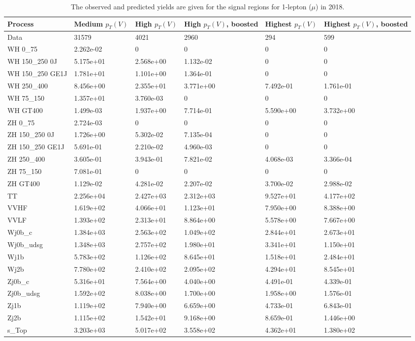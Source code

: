 \begin{table}
\centering
\caption[2018 1-lepton ($\mu$) signal selection yields]{
                  The observed and predicted yields are given for the
                  signal regions for 1-lepton ($\mu$) in 2018.
                  }
{\footnotesize
\begin{tabularx}{\textwidth}{|X|X|X|X|X|X|}
\hline
Process & Medium $p_{T}(V)$ & High $p_{T}(V)$ & High $p_{T}(V)$, boosted & Highest $p_{T}(V)$ & Highest $p_{T}(V)$, boosted \\
\hline
Data & 31579 & 4021 & 2960 & 294 & 599 \\
\hline
WH 0\_75 & 2.262e-02 & 0 & 0 & 0 & 0 \\
WH 150\_250 0J & 5.175e+01 & 2.568e+00 & 1.132e-02 & 0 & 0 \\
WH 150\_250 GE1J & 1.781e+01 & 1.101e+00 & 1.364e-01 & 0 & 0 \\
WH 250\_400 & 8.456e+00 & 2.355e+01 & 3.771e+00 & 7.492e-01 & 1.761e-01 \\
WH 75\_150 & 1.357e+01 & 3.760e-03 & 0 & 0 & 0 \\
WH GT400 & 1.499e-03 & 1.937e+00 & 7.714e-01 & 5.590e+00 & 3.732e+00 \\
ZH 0\_75 & 2.724e-03 & 0 & 0 & 0 & 0 \\
ZH 150\_250 0J & 1.726e+00 & 5.302e-02 & 7.135e-04 & 0 & 0 \\
ZH 150\_250 GE1J & 5.691e-01 & 2.210e-02 & 4.960e-03 & 0 & 0 \\
ZH 250\_400 & 3.605e-01 & 3.943e-01 & 7.821e-02 & 4.068e-03 & 3.366e-04 \\
ZH 75\_150 & 7.081e-01 & 0 & 0 & 0 & 0 \\
ZH GT400 & 1.129e-02 & 4.281e-02 & 2.207e-02 & 3.700e-02 & 2.988e-02 \\
\hline
TT & 2.256e+04 & 2.427e+03 & 2.312e+03 & 9.527e+01 & 4.177e+02 \\
VVHF & 1.619e+02 & 4.066e+01 & 1.123e+01 & 7.950e+00 & 8.388e+00 \\
VVLF & 1.393e+02 & 2.313e+01 & 8.864e+00 & 5.578e+00 & 7.667e+00 \\
Wj0b\_c & 1.384e+03 & 2.563e+02 & 1.049e+02 & 2.844e+01 & 2.673e+01 \\
Wj0b\_udsg & 1.348e+03 & 2.757e+02 & 1.980e+01 & 3.341e+01 & 1.150e+01 \\
Wj1b & 5.783e+02 & 1.126e+02 & 8.645e+01 & 1.518e+01 & 2.484e+01 \\
Wj2b & 7.780e+02 & 2.410e+02 & 2.095e+02 & 4.294e+01 & 8.545e+01 \\
Zj0b\_c & 5.316e+01 & 7.564e+00 & 4.040e+00 & 4.491e-01 & 4.339e-01 \\
Zj0b\_udsg & 1.592e+02 & 8.038e+00 & 1.700e+00 & 1.958e+00 & 1.576e-01 \\
Zj1b & 1.119e+02 & 7.940e+00 & 6.659e+00 & 4.733e-01 & 6.843e-01 \\
Zj2b & 1.115e+02 & 1.542e+01 & 9.168e+00 & 8.659e-01 & 1.446e+00 \\
s\_Top & 3.203e+03 & 5.017e+02 & 3.558e+02 & 4.362e+01 & 1.380e+02 \\
\hline
\end{tabularx}
}
\label{tab:sr-Wmn-2018}
\end{table}

